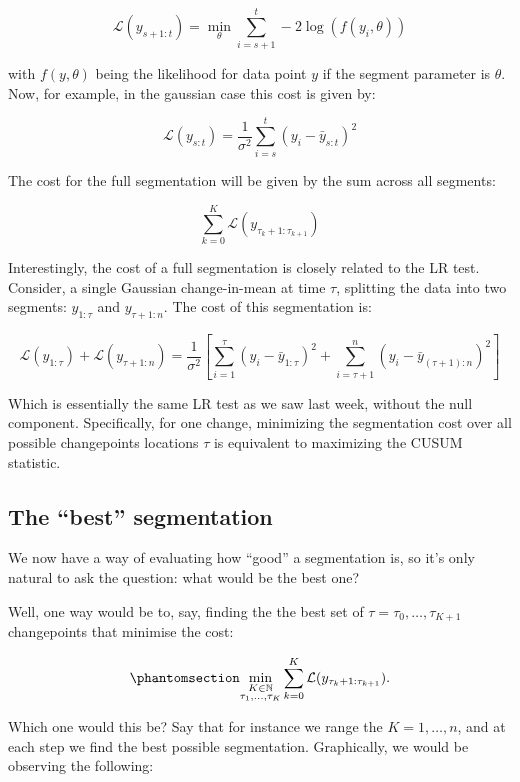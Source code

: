 \documentclass[
  letterpaper,
  DIV=11,
  numbers=noendperiod]{scrreprt}
\begin{document}
\[
    \mathcal{L}(y_{s+1:t}) = \min_\theta \sum_{i = s + 1}^{t} - 2 \log(f(y_i, \theta))
\]

with \(f(y, \theta)\) being the likelihood for data point \(y\) if the
segment parameter is \(\theta\). Now, for example, in the gaussian case
this cost is given by:

\[
\mathcal{L}(y_{s:t}) = \frac{1}{\sigma^2}  \sum_{i = s}^{t} \left ( y_i - \bar{y}_{s:t} \right)^2
\]

The cost for the full segmentation will be given by the sum across all
segments:

\[
\sum_{k = 0}^K \mathcal{L}(y_{\tau_k+1:\tau_{k+1}})
\]

Interestingly, the cost of a full segmentation is closely related to the
LR test. Consider, a single Gaussian change-in-mean at time \(\tau\),
splitting the data into two segments: \(y_{1:\tau}\) and
\(y_{\tau+1:n}\). The cost of this segmentation is:

\[
\mathcal{L}(y_{1:\tau}) + \mathcal{L}(y_{\tau+1:n}) = \frac{1}{\sigma^2} \left[\sum_{i=1}^{\tau} (y_i - \bar{y}_{1:\tau})^2 + \sum_{i=\tau+1}^{n} (y_i - \bar{y}_{(\tau+1):n})^2 \right]
\]

Which is essentially the same LR test as we saw last week, without the
null component. Specifically, for one change, minimizing the
segmentation cost over all possible changepoints locations \(\tau\) is
equivalent to maximizing the CUSUM statistic.

\subsection{The ``best'' segmentation}\label{the-best-segmentation}

We now have a way of evaluating how ``good'' a segmentation is, so it's
only natural to ask the question: what would be the best one?

Well, one way would be to, say, finding the the best set of
\(\tau = \tau_0, \dots, \tau_{K+1}\) changepoints that minimise the
cost:

\begin{equation}\phantomsection\label{eq-segment_cost}{
\min_{\substack{K \in \mathbb{N}\\ \tau_1, \dots, \tau_K}} \sum_{k = 0}^K \mathcal{L}(y_{\tau_k+1:\tau_{k+1}}).
}\end{equation}

Which one would this be? Say that for instance we range the
\(K = 1, \dots, n\), and at each step we find the best possible
segmentation. Graphically, we would be observing the following:
\end{document}

